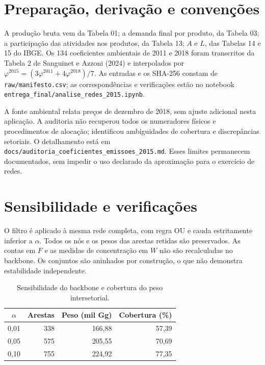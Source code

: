 \clearpage
\appendix
\section{Preparação, derivação e convenções}
\label{ap:metodo}

A produção bruta vem da Tabela 01; a demanda final por produto, da Tabela 03; a participação das atividades nos produtos, da Tabela 13; $A$ e $L$, das Tabelas 14 e 15 do IBGE. Os 134 coeficientes ambientais de 2011 e 2018 foram transcritos da Tabela 2 de Sanguinet e Azzoni (2024) e interpolados por $\varphi^{2015}=(3\varphi^{2011}+4\varphi^{2018})/7$. As entradas e os SHA-256 constam de \texttt{raw/manifesto.csv}; as correspondências e verificações estão no notebook \texttt{entrega\_final/analise\_redes\_2015.ipynb}.

A fonte ambiental relata preços de dezembro de 2018, sem ajuste adicional nesta aplicação. A auditoria não recuperou todos os numeradores físicos e procedimentos de alocação; identificou ambiguidades de cobertura e discrepâncias setoriais. O detalhamento está em \texttt{docs/auditoria\_coeficientes\_emissoes\_2015.md}. Esses limites permanecem documentados, sem impedir o uso declarado da aproximação para o exercício de redes.



\clearpage
\section{Sensibilidade e verificações}
\label{ap:sensibilidade}

O filtro é aplicado à mesma rede completa, com regra OU e cauda estritamente inferior a $\alpha$. Todos os nós e os pesos das arestas retidas são preservados. As contas em $F$ e as medidas de concentração em $W$ não são recalculadas no backbone. Os conjuntos são aninhados por construção, o que não demonstra estabilidade independente.

\begin{table}[H]\centering
\caption{Sensibilidade do backbone e cobertura do peso intersetorial.}
\begin{tabular}{crrr}\toprule
$\alpha$ & Arestas & Peso (mil Gg) & Cobertura (\%)\\\midrule
0,01 & 338 & 166,88 & 57,39\\
0,05 & 575 & 205,55 & 70,69\\
0,10 & 755 & 224,92 & 77,35\\\bottomrule
\end{tabular}
\end{table}

